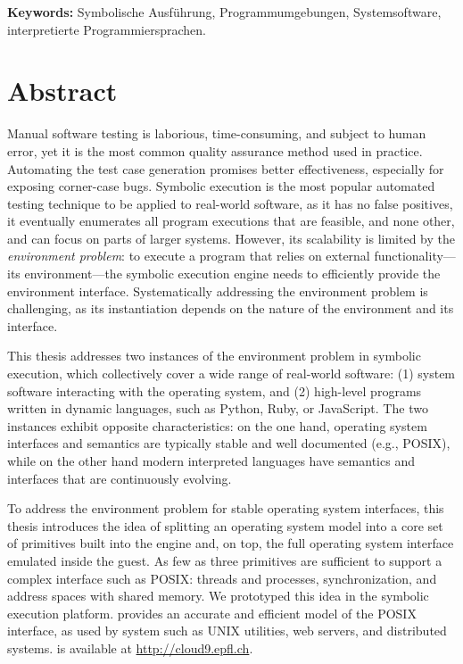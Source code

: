 \noindent \textbf{Keywords:} Symbolische Ausführung, Programmumgebungen, Systemsoftware, interpretierte Programmiersprachen.

\chapter*{Abstract}

Manual software testing is laborious, time-consuming, and subject to human error, yet it is the most common quality assurance method used in practice.
%
Automating the test case generation promises better effectiveness, especially for exposing corner-case bugs.
%
Symbolic execution is the most popular automated testing technique to be applied to real-world software, as it has no false positives, it eventually enumerates all program executions that are feasible, and none other, and can focus on parts of larger systems.
%
However, its scalability is limited by the \emph{environment problem}: to execute a program that relies on external functionality---its environment---the symbolic execution engine needs to efficiently provide the environment interface.
%
Systematically addressing the environment problem is challenging, as its instantiation depends on the nature of the environment and its interface.

This thesis addresses two instances of the environment problem in symbolic execution, which collectively cover a wide range of real-world software: (1) system software interacting with the operating system, and (2) high-level programs written in dynamic languages, such as Python, Ruby, or JavaScript.
%
The two instances exhibit opposite characteristics: on the one hand, operating system interfaces and semantics are typically stable and well documented (e.g., POSIX), while on the other hand modern interpreted languages have semantics and interfaces that are continuously evolving.

To address the environment problem for stable operating system interfaces, this thesis introduces the idea of splitting an operating system model into a core set of primitives built into the engine and, on top, the full operating system interface emulated inside the guest.
%
As few as three primitives are sufficient to support a complex interface such as POSIX: threads and processes, synchronization, and address spaces with shared memory.
%
We prototyped this idea in the \emph{\cnine} symbolic execution platform. \cnine provides an accurate and efficient model of the POSIX interface, as used by system such as UNIX utilities, web servers, and distributed systems.
%
\cnine is available at {\url{http://cloud9.epfl.ch}}.

